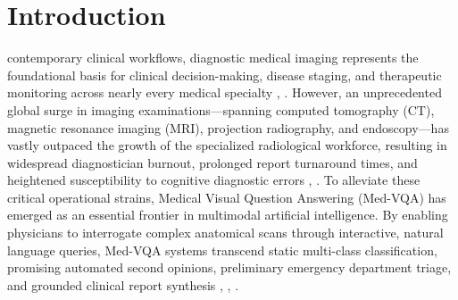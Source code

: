 \documentclass[journal,twoside,web]{ieeecolor}
\begin{document}
\section{Introduction}
\label{sec:introduction}
 contemporary clinical workflows, diagnostic medical imaging represents the foundational basis for clinical decision-making, disease staging, and therapeutic monitoring across nearly every medical specialty \cite{rubin2019}, \cite{gale2020}. However, an unprecedented global surge in imaging examinations---spanning computed tomography (CT), magnetic resonance imaging (MRI), projection radiography, and endoscopy---has vastly outpaced the growth of the specialized radiological workforce, resulting in widespread diagnostician burnout, prolonged report turnaround times, and heightened susceptibility to cognitive diagnostic errors \cite{wang2024chatcadplus}, \cite{yan2024tokenmixer}. To alleviate these critical operational strains, Medical Visual Question Answering (Med-VQA) has emerged as an essential frontier in multimodal artificial intelligence. By enabling physicians to interrogate complex anatomical scans through interactive, natural language queries, Med-VQA systems transcend static multi-class classification, promising automated second opinions, preliminary emergency department triage, and grounded clinical report synthesis \cite{hu2024omnimedvqa}, \cite{he2020pathvqa}, \cite{jha2023}.
\end{document}

